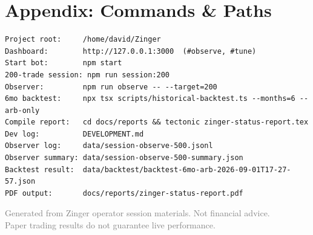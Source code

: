 \documentclass[11pt,a4paper]{article}
\begin{document}
\section{Appendix: Commands \& Paths}

\begin{verbatim}
Project root:     /home/david/Zinger
Dashboard:        http://127.0.0.1:3000  (#observe, #tune)
Start bot:        npm start
200-trade session: npm run session:200
Observer:         npm run observe -- --target=200
6mo backtest:     npx tsx scripts/historical-backtest.ts --months=6 --arb-only
Compile report:   cd docs/reports && tectonic zinger-status-report.tex
Dev log:          DEVELOPMENT.md
Observer log:     data/session-observe-500.jsonl
Observer summary: data/session-observe-500-summary.json
Backtest result:  data/backtest/backtest-6mo-arb-2026-09-01T17-27-57.json
PDF output:       docs/reports/zinger-status-report.pdf
\end{verbatim}

\vfill
\begin{center}
\small
\textcolor{gray}{Generated from Zinger operator session materials. Not financial advice.\\
Paper trading results do not guarantee live performance.}
\end{center}
\end{document}
